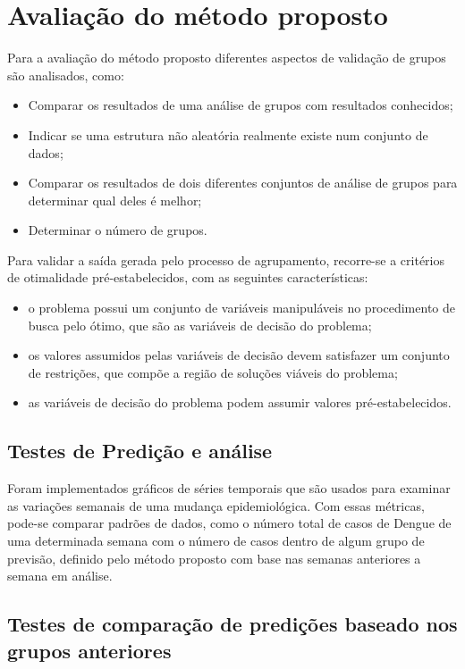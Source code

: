 \chapter{Avaliação do método proposto}
\label{chap:avaliacao}
Para a avaliação do método proposto diferentes aspectos de validação de grupos são analisados, como:
\begin{itemize}
    \item Comparar os resultados de uma análise de grupos com resultados conhecidos;
    \item Indicar se uma estrutura não aleatória realmente existe num conjunto de dados;
    \item Comparar os resultados de dois diferentes conjuntos de análise de grupos para determinar qual deles é melhor;
    \item Determinar o número de grupos.
\end{itemize}

Para validar a saída gerada pelo processo de agrupamento, recorre-se a critérios de otimalidade pré-estabelecidos, com as seguintes características:
\begin{itemize}
    \item o problema possui um conjunto de variáveis manipuláveis no procedimento de busca pelo ótimo, que são as variáveis de decisão do problema;
    \item os valores assumidos pelas variáveis de decisão devem satisfazer um conjunto de restrições, que compõe a região de soluções viáveis do problema;
    \item as variáveis de decisão do problema podem assumir valores pré-estabelecidos.
\end{itemize}

\section{Testes de Predição e análise}

Foram implementados gráficos de séries temporais que são usados para examinar as variações semanais de uma mudança epidemiológica. Com essas métricas, pode-se comparar padrões de dados, como o número total de casos de Dengue de uma determinada semana com o número de casos dentro de algum grupo de previsão, definido pelo método proposto com base nas semanas anteriores a semana em análise.


\section{Testes de comparação de predições baseado nos grupos anteriores}

